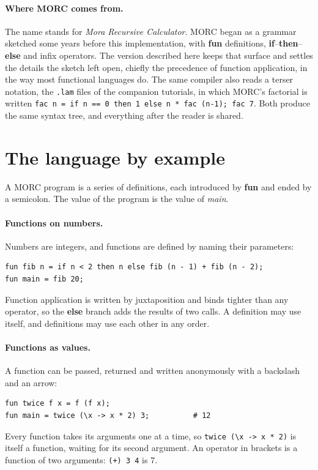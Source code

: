 \documentclass[11pt,a4paper]{article}
\theoremstyle{definition}
\theoremstyle{plain}
\newcommand{\kw}[1]{\textbf{#1}}
\begin{document}
\paragraph{Where MORC comes from.} The name stands for \emph{Mora Recursive
Calculator}. MORC began as a grammar sketched some years before this
implementation, with \kw{fun} definitions, \kw{if}--\kw{then}--\kw{else} and
infix operators. The version described here keeps that surface and settles
the details the sketch left open, chiefly the precedence of function
application, in the way most functional languages do. The same compiler
also reads a terser notation, the \texttt{.lam} files of the companion
tutorials, in which MORC's factorial is written
\verb|fac n = if n == 0 then 1 else n * fac (n-1); fac 7|. Both produce the
same syntax tree, and everything after the reader is shared.

\section{The language by example}\label{sec:language}

A MORC program is a series of definitions, each introduced by \kw{fun} and
ended by a semicolon. The value of the program is the value of \textit{main}.

\paragraph{Functions on numbers.} Numbers are integers, and functions are
defined by naming their parameters:
\begin{lstlisting}[style=morc]
fun fib n = if n < 2 then n else fib (n - 1) + fib (n - 2);
fun main = fib 20;
\end{lstlisting}
Function application is written by juxtaposition and binds tighter than any
operator, so the \kw{else} branch adds the results of two calls. A definition may
use itself, and definitions may use each other in any order.

\paragraph{Functions as values.} A function can be passed, returned and
written anonymously with a backslash and an arrow:
\begin{lstlisting}[style=morc]
fun twice f x = f (f x);
fun main = twice (\x -> x * 2) 3;          # 12
\end{lstlisting}
Every function takes its arguments one at a time, so \verb|twice (\x -> x * 2)|
is itself a function, waiting for its second argument. An operator in
brackets is a function of two arguments: \verb|(+) 3 4| is 7.
\end{document}

